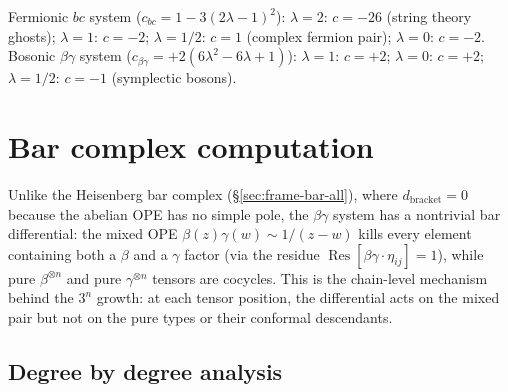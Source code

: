 \begin{computation}
\label{comp:beta-gamma-central-charges}
\label{def:beta-gamma-ope-complete}
Fermionic $bc$ system ($c_{bc} = 1 - 3(2\lambda-1)^2$):
$\lambda = 2$: $c = -26$ (string theory ghosts);
$\lambda = 1$: $c = -2$;
$\lambda = 1/2$: $c = 1$ (complex fermion pair);
$\lambda = 0$: $c = -2$.
Bosonic $\beta\gamma$ system ($c_{\beta\gamma} = +2(6\lambda^2 - 6\lambda + 1)$):
$\lambda = 1$: $c = +2$;
$\lambda = 0$: $c = +2$;
$\lambda = 1/2$: $c = -1$ (symplectic bosons).
\end{computation}

\section{Bar complex computation}

Unlike the Heisenberg bar complex (\S\ref{sec:frame-bar-all}), where $d_{\mathrm{bracket}} = 0$ because the abelian OPE has no simple pole, the $\beta\gamma$ system has a nontrivial bar differential: the mixed OPE $\beta(z)\gamma(w) \sim 1/(z-w)$ kills every element containing both a $\beta$ and a $\gamma$ factor (via the residue $\operatorname{Res}[\beta\gamma \cdot \eta_{ij}] = 1$), while pure $\beta^{\otimes n}$ and pure $\gamma^{\otimes n}$ tensors are cocycles.  This is the chain-level mechanism behind the $3^n$ growth: at each tensor position, the differential acts on the mixed pair but not on the pure types or their conformal descendants.

\subsection{Degree by degree analysis}

